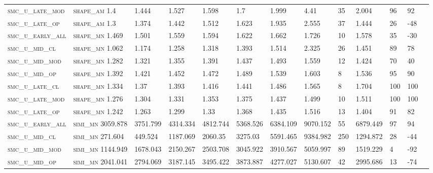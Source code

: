 \begin{landscape}
\begin{center}
\begin{footnotesize}
\begin{longtable}{lllllllllllll}
\textsc{smc\_u\_late\_mod } & \textsc{shape\_am }   1.4      & 1.444    & 1.527    & 1.598    & 1.7      & 1.999    & 4.41     & 35   & 2.004    & 96  & 92   \\
\textsc{smc\_u\_late\_op  } & \textsc{shape\_am }   1.3      & 1.374    & 1.442    & 1.512    & 1.623    & 1.935    & 2.555    & 37   & 1.444    & 26  & -48  \\
\textsc{smc\_u\_early\_all} & \textsc{shape\_mn }   1.469    & 1.501    & 1.559    & 1.594    & 1.622    & 1.662    & 1.726    & 10   & 1.578    & 35  & -30  \\
\textsc{smc\_u\_mid\_cl   } & \textsc{shape\_mn }   1.062    & 1.174    & 1.258    & 1.318    & 1.393    & 1.514    & 2.325    & 26   & 1.451    & 89  & 78   \\
\textsc{smc\_u\_mid\_mod  } & \textsc{shape\_mn }   1.282    & 1.321    & 1.355    & 1.391    & 1.437    & 1.493    & 1.559    & 12   & 1.424    & 70  & 40   \\
\textsc{smc\_u\_mid\_op   } & \textsc{shape\_mn }   1.392    & 1.421    & 1.452    & 1.472    & 1.489    & 1.539    & 1.603    & 8    & 1.536    & 95  & 90   \\
\textsc{smc\_u\_late\_cl  } & \textsc{shape\_mn }   1.334    & 1.37     & 1.393    & 1.416    & 1.441    & 1.486    & 1.565    & 8    & 1.704    & 100 & 100  \\
\textsc{smc\_u\_late\_mod } & \textsc{shape\_mn }   1.276    & 1.304    & 1.331    & 1.353    & 1.375    & 1.437    & 1.499    & 10   & 1.511    & 100 & 100  \\
\textsc{smc\_u\_late\_op  } & \textsc{shape\_mn }   1.242    & 1.263    & 1.299    & 1.33     & 1.368    & 1.435    & 1.516    & 13   & 1.404    & 91  & 82   \\
\textsc{smc\_u\_early\_all} & \textsc{simi\_mn  }   3059.878 & 3751.799 & 4314.334 & 4812.744 & 5368.526 & 6384.109 & 9070.152 & 55   & 6879.449 & 97  & 94   \\
\textsc{smc\_u\_mid\_cl   } & \textsc{simi\_mn  }   271.604  & 449.524  & 1187.069 & 2060.35  & 3275.03  & 5591.465 & 9384.982 & 250  & 1294.872 & 28  & -44  \\
\textsc{smc\_u\_mid\_mod  } & \textsc{simi\_mn  }   1144.949 & 1678.043 & 2150.267 & 2503.708 & 3045.922 & 3910.567 & 5059.997 & 89   & 1519.229 & 4   & -92  \\
\textsc{smc\_u\_mid\_op   } & \textsc{simi\_mn  }   2041.041 & 2794.069 & 3187.145 & 3495.422 & 3873.887 & 4277.027 & 5130.607 & 42   & 2995.686 & 13  & -74  \\

\end{longtable}
\end{footnotesize}
\end{center}
\end{landscape}
